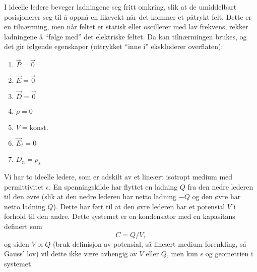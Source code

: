\noindent I ideelle ledere beveger ladningene seg fritt omkring, slik at de umiddelbart posisjonerer seg til å oppnå en likevekt når det kommer et påtrykt felt. Dette er en tilnærming, men når feltet er statisk eller oscillerer med lav frekvens, rekker ladningene å ``følge med'' det elektriske feltet. Da kan tilnærmingen brukes, og det gir følgende egenskaper (uttrykket ``inne i'' ekskluderer overflaten):
\begin{enumerate}
	\item $\vec{P}=\vec{0}$ 
	\item $\vec{E}=\vec{0}$ 
	\item $\vec{D}=\vec{0}$ 
	\item $\rho=0$ 
	\item $V=\text{konst.}$ 
	\item $\vec{E}_t=0$ 
	\item $D_n=\rho_s$ 
\end{enumerate}

\noindent Vi har to ideelle ledere, som er adskilt av et lineært isotropt medium med permittivitet $\epsilon$. En spenningskilde har flyttet en ladning $Q$ fra den nedre lederen til den øvre (slik at den nedre lederen har netto ladning $-Q$ og den øvre har netto ladning $Q$). Dette har ført til at den øvre lederen har et potensial $V$ i forhold til den andre. Dette systemet er en kondensator med en kapasitans definert som 
\begin{equation}
	C=Q/V,
\end{equation}
og siden $V\propto Q$ (bruk definisjon av potensial, så lineært medium-forenkling, så Gauss' lov) vil dette ikke være avhengig av $V$ eller $Q$, men kun $\epsilon$ og geometrien i systemet.

